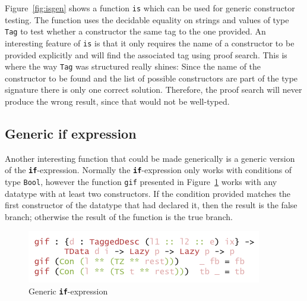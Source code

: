 \documentclass{ituthesis}
\newcommand{\tttype}[1]{\textcolor{type-color}{\texttt{#1}}}
\newcommand{\ttdec}[1]{\textcolor{declared-var-color}{\texttt{#1}}}
\theoremstyle{break}
\begin{document}
Figure~\ref{fig:isgen} shows a function \ttdec{is} which can be used for generic constructor testing.
The function uses the decidable equality on strings and values of type \tttype{Tag} to test whether a constructor the same tag to the one provided.
An interesting feature of \ttdec{is} is that it only requires the name of a constructor to be provided explicitly and will find the associated tag using proof search.
This is where the way \tttype{Tag} was structured really shines: Since the name of the constructor to be found and the list of possible constructors are part of the type signature
there is only one correct solution.
Therefore, the proof search will never produce the wrong result, since that would not be well-typed.

\subsection{Generic if expression}
\label{sub:Generic if expression}
Another interesting function that could be made generically is a generic version of the \texttt{\textbf{if}}-expression.
Normally the \texttt{\textbf{if}}-expression only works with conditions of type \tttype{Bool}, however the function \ttdec{gif} presented in Figure~\ref{fig:ifgen} works with any datatype with at least two constructors.
If the condition provided matches the first constructor of the datatype that had declared it, then the result is the false branch; otherwise the result of the function is the true branch.

\begin{figure}[ht]
\begin{center}
    \includegraphics[scale=0.5]{Figures/GenericIf.png}
\end{center}
\caption{Generic \texttt{\textbf{if}}-expression}
\label{fig:ifgen}
\end{figure}
\end{document}
